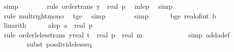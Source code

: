 \begin{isabellebody}
\ simp\isanewline
\ \ \ \ \ \ \isamarkupfalse%
\ {\isacharparenleft}{\kern0pt}rule\ order{\isacharunderscore}{\kern0pt}trans{\isacharbrackleft}{\kern0pt}\ y{\isacharequal}{\kern0pt}{\isachardoublequoteopen}{}\ {\isacharasterisk}{\kern0pt}\ real\ p{\isachardoublequoteclose}{\isacharbrackright}{\kern0pt}{\isacharparenright}{\kern0pt}\ \isamarkupfalse%
\ m{\isacharunderscore}{\kern0pt}le{\isacharunderscore}{\kern0pt}p\ \isamarkupfalse%
\ simp\isanewline
\ \ \ \ \ \ \isamarkupfalse%
\ {\isacharparenleft}{\kern0pt}rule\ mult{\isacharunderscore}{\kern0pt}right{\isacharunderscore}{\kern0pt}mono{\isacharparenright}{\kern0pt}\ \isamarkupfalse%
\ t{\isacharunderscore}{\kern0pt}ge{\isacharunderscore}{\kern0pt}{}\ \isamarkupfalse%
\ simp\isanewline
\ \ \ \ \ \ \isamarkupfalse%
\ simp\isanewline
\ \ \ \ \isamarkupfalse%
\ b{\isacharunderscore}{\kern0pt}ge{\isacharunderscore}{\kern0pt}{}{\isacharcolon}{\kern0pt}\ {\isachardoublequoteopen}real{\isacharunderscore}{\kern0pt}of{\isacharunderscore}{\kern0pt}int\ b\ {\isasymge}\ {}{\isachardoublequoteclose}\isanewline
\ \ \ \ \ \ \isamarkupfalse%
\ linarith\isanewline
\isanewline
\ \ \ \ \isamarkupfalse%
\ a{\isacharunderscore}{\kern0pt}le{\isacharunderscore}{\kern0pt}p{\isacharcolon}{\kern0pt}\ {\isachardoublequoteopen}a\ {\isacharless}{\kern0pt}\ real\ p{\isachardoublequoteclose}\isanewline
\ \ \ \ \ \ \isamarkupfalse%
\ {\isacharparenleft}{\kern0pt}rule\ order{\isacharunderscore}{\kern0pt}le{\isacharunderscore}{\kern0pt}less{\isacharunderscore}{\kern0pt}trans{\isacharbrackleft}{\kern0pt}\ y{\isacharequal}{\kern0pt}{\isachardoublequoteopen}real\ t\ {\isacharasterisk}{\kern0pt}\ real\ p\ {\isacharslash}{\kern0pt}\ {\isacharparenleft}{\kern0pt}real\ m\ {\isacharasterisk}{\kern0pt}\ {\isacharparenleft}{\kern0pt}{}\ {\isacharplus}{\kern0pt}\ {\isasymdelta}{\isacharprime}{\kern0pt}{\isacharparenright}{\kern0pt}{\isacharparenright}{\kern0pt}{\isachardoublequoteclose}{\isacharbrackright}{\kern0pt}{\isacharparenright}{\kern0pt}\isanewline
\ \ \ \ \ \ \ \isamarkupfalse%
\ {\isacharparenleft}{\kern0pt}simp\ add{\isacharcolon}{\kern0pt}a{\isacharunderscore}{\kern0pt}def{\isacharparenright}{\kern0pt}\isanewline
\ \ \ \ \ \ \isamarkupfalse%
\ {\isacharparenleft}{\kern0pt}subst\ pos{\isacharunderscore}{\kern0pt}divide{\isacharunderscore}{\kern0pt}less{\isacharunderscore}{\kern0pt}eq{\isacharparenright}{\kern0pt}\ \isamarkupfalse%

\end{isabellebody}
